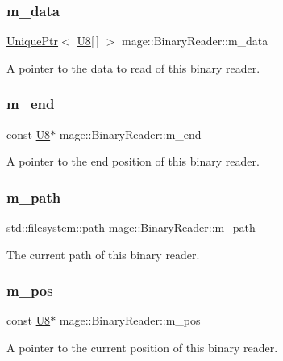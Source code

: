 \subsubsection{\texorpdfstring{m\+\_\+data}{m\_data}}
{\footnotesize\ttfamily \mbox{\hyperlink{namespacemage_a3316d7143a973e37adf1110f2e80ca31}{Unique\+Ptr}}$<$ \mbox{\hyperlink{namespacemage_afc638980bc6154f15af5e2d93a0e0ea9}{U8}}\mbox{[}$\,$\mbox{]} $>$ mage\+::\+Binary\+Reader\+::m\+\_\+data\hspace{0.3cm}{\ttfamily [private]}}

A pointer to the data to read of this binary reader. \mbox{\label{classmage_1_1_binary_reader_a19b0f36cb1e8a05aaa9471514242e8ef}} 
\subsubsection{\texorpdfstring{m\+\_\+end}{m\_end}}
{\footnotesize\ttfamily const \mbox{\hyperlink{namespacemage_afc638980bc6154f15af5e2d93a0e0ea9}{U8}}$\ast$ mage\+::\+Binary\+Reader\+::m\+\_\+end\hspace{0.3cm}{\ttfamily [private]}}

A pointer to the end position of this binary reader. \mbox{\label{classmage_1_1_binary_reader_a0941e624c8386fee2e2e92c6d1efdb75}} 
\subsubsection{\texorpdfstring{m\+\_\+path}{m\_path}}
{\footnotesize\ttfamily std\+::filesystem\+::path mage\+::\+Binary\+Reader\+::m\+\_\+path\hspace{0.3cm}{\ttfamily [private]}}

The current path of this binary reader. \mbox{\label{classmage_1_1_binary_reader_aedb9632de1cf95d5af49499217744ed5}} 
\subsubsection{\texorpdfstring{m\+\_\+pos}{m\_pos}}
{\footnotesize\ttfamily const \mbox{\hyperlink{namespacemage_afc638980bc6154f15af5e2d93a0e0ea9}{U8}}$\ast$ mage\+::\+Binary\+Reader\+::m\+\_\+pos\hspace{0.3cm}{\ttfamily [private]}}

A pointer to the current position of this binary reader. 